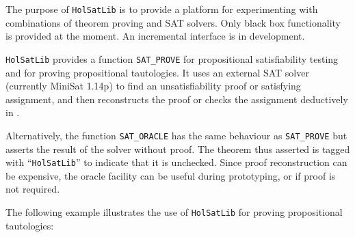 


\renewcommand{\t}[1]{\mbox{\small\tt #1}}



\newcommand\Hol{HOL}





%

\setcounter{sessioncount}{0}

%

The purpose of {\tt{HolSatLib}} is to provide a platform for experimenting with combinations of theorem proving and SAT solvers. Only black box functionality is provided at the moment. An incremental interface is in development.

{\tt{HolSatLib}} provides a function {\tt SAT\_PROVE}  for propositional satisfiability testing and for proving propositional tautologies. It uses an external SAT solver (currently MiniSat 1.14p) to find an unsatisfiability proof or satisfying assignment, and then reconstructs the proof or checks the assignment deductively in \HOL.

Alternatively, the function {\tt SAT\_ORACLE}  has the same behaviour as {\tt SAT\_PROVE} but asserts the result of the solver without proof. The theorem thus asserted is tagged with ``{\tt{HolSatLib}}'' to indicate that it is unchecked. Since proof reconstruction can be expensive, the oracle facility can be useful during prototyping, or if proof is not required.

The following example illustrates the use of {\tt{HolSatLib}} for proving propositional tautologies:

